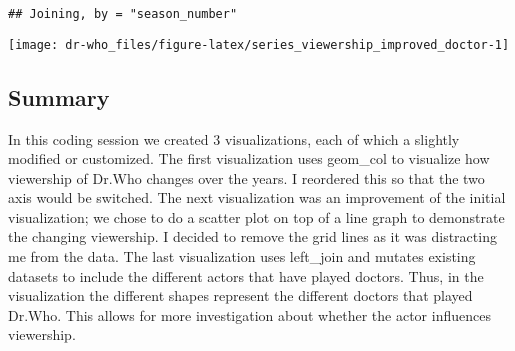 \documentclass[
]{article}
\begin{document}
\begin{verbatim}
## Joining, by = "season_number"
\end{verbatim}

\texttt{[image: dr-who\_files/figure-latex/series\_viewership\_improved\_doctor-1]}

\hypertarget{summary}{%
\subsection{Summary}\label{summary}}

In this coding session we created 3 visualizations, each of which a
slightly modified or customized. The first visualization uses geom\_col
to visualize how viewership of Dr.Who changes over the years. I
reordered this so that the two axis would be switched. The next
visualization was an improvement of the initial visualization; we chose
to do a scatter plot on top of a line graph to demonstrate the changing
viewership. I decided to remove the grid lines as it was distracting me
from the data. The last visualization uses left\_join and mutates
existing datasets to include the different actors that have played
doctors. Thus, in the visualization the different shapes represent the
different doctors that played Dr.Who. This allows for more investigation
about whether the actor influences viewership.
\end{document}
